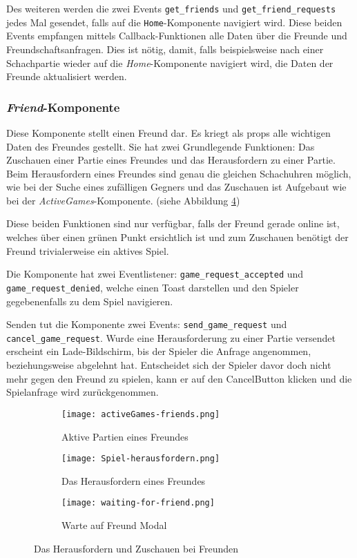Des weiteren werden die zwei Events \verb|get_friends| und \verb|get_friend_requests| jedes Mal gesendet, falls auf die \verb|Home|-Komponente navigiert wird. Diese beiden Events empfangen mittels Callback-Funktionen alle Daten über die Freunde und Freundschaftsanfragen. Dies ist nötig, damit, falls beispielsweise nach einer Schachpartie wieder auf die \textit{Home}-Komponente navigiert wird, die Daten der Freunde aktualisiert werden.

\subsubsection{\textit{Friend}-Komponente}
\label{sec:friend-komponente}
Diese Komponente stellt einen Freund dar. Es kriegt als props alle wichtigen Daten des Freundes gestellt. Sie hat zwei Grundlegende Funktionen: Das Zuschauen einer Partie eines Freundes und das Herausfordern zu einer Partie. Beim Herausfordern eines Freundes sind genau die gleichen Schachuhren möglich, wie bei der Suche eines zufälligen Gegners und das Zuschauen ist Aufgebaut wie bei der \textit{ActiveGames}-Komponente. (siehe Abbildung \ref{fig:Freunde-zuschauen-herausfordern})

Diese beiden Funktionen sind nur verfügbar, falls der Freund gerade online ist, welches über einen grünen Punkt ersichtlich ist und zum Zuschauen benötigt der Freund trivialerweise ein aktives Spiel.

Die Komponente hat zwei Eventlistener: \verb|game_request_accepted| und \verb|game_request_denied|, welche einen Toast darstellen und den Spieler gegebenenfalls zu dem Spiel navigieren. 

Senden tut die Komponente zwei Events: \verb|send_game_request| und \verb|cancel_game_request|. Wurde eine Herausforderung zu einer Partie versendet erscheint ein Lade-Bildschirm, bis der Spieler die Anfrage angenommen, beziehungsweise abgelehnt hat. Entscheidet sich der Spieler davor doch nicht mehr gegen den Freund zu spielen, kann er auf den \glqq Cancel\grqq{ }Button klicken und die Spielanfrage wird zurückgenommen.

\begin{figure}[h]
\centering
  \begin{subfigure}[c]{0.35\textwidth}
  \centering
  \texttt{[image: activeGames-friends.png]}
  \caption{Aktive Partien eines Freundes}
  \label{fig:activeGames-friends}
  \end{subfigure}
  \hfill
  \begin{subfigure}[c]{0.3\textwidth}
  \centering
    \texttt{[image: Spiel-herausfordern.png]}
  \caption{Das Herausfordern eines Freundes}
  \label{fig:spiel-herausfordern}
  \end{subfigure}
  \hfill
 \begin{subfigure}[c]{0.3\textwidth}
  \centering
    \texttt{[image: waiting-for-friend.png]}
  \caption{Warte auf Freund Modal}
  \label{fig:waiting-for-friend}
  \end{subfigure}
  \caption{Das Herausfordern und Zuschauen bei Freunden}
  \label{fig:Freunde-zuschauen-herausfordern}
 
\end{figure}



